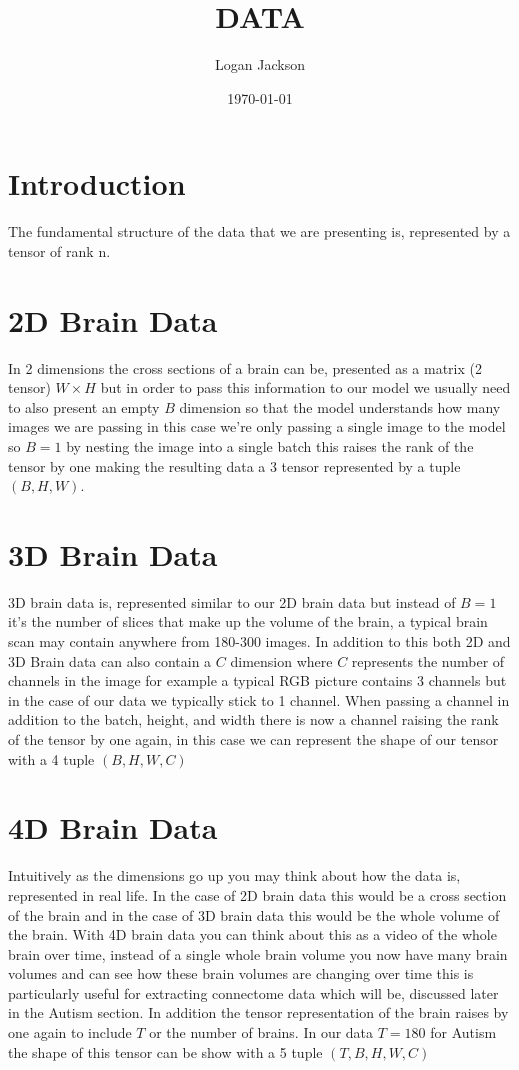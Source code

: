 \documentclass[11pt]{article}
\author{Logan Jackson}
\date{\today}
\title{DATA}
\begin{document}
\maketitle
\tableofcontents


\section{Introduction}
\label{sec:org4372add}
The fundamental structure of the data that we are presenting is, represented by a tensor of rank n.

\section{2D Brain Data}
\label{sec:org8177715}
In 2 dimensions the cross sections of a brain can be, presented as a matrix (2 tensor) \(W \times H\) but in order to pass
this information to our model we usually need to also present an empty \(B\) dimension so that the model
understands how many images we are passing in this case we're only passing a single image to the model so \(B=1\)
by nesting the image into a single batch this raises the rank of the tensor by one making the resulting data a 3 tensor
represented by a tuple \((B, H, W)\).

\section{3D Brain Data}
\label{sec:org7e99bdf}
3D brain data is, represented similar to our 2D brain data but instead of \(B=1\) it's the number of slices that make
up the volume of the brain, a typical brain scan may contain anywhere from 180-300 images. In addition to this both
2D and 3D Brain data can also contain a \(C\) dimension where \(C\) represents the number of channels in the image
for example a typical RGB picture contains 3 channels but in the case of our data we typically stick to 1 channel.
When passing a channel in addition to the batch, height, and width there is now a channel raising the rank of the tensor
by one again, in this case we can represent the shape of our tensor with a 4 tuple \((B, H, W, C)\)

\section{4D Brain Data}
\label{sec:org641f6fc}
Intuitively as the dimensions go up you may think about how the data is, represented in real life. In the case of
2D brain data this would be a cross section of the brain and in the case of 3D brain data this would be the whole
volume of the brain. With 4D brain data you can think about this as a video of the whole brain over time, instead
of a single whole brain volume you now have many brain volumes and can see how these brain volumes are changing
over time this is particularly useful for extracting connectome data which will be, discussed later in the Autism
section. In addition the tensor representation of the brain raises by one again to include \(T\) or the number of
brains. In our data \(T = 180\) for Autism the shape of this tensor can be show with a 5 tuple \((T, B, H, W, C)\)
\end{document}

